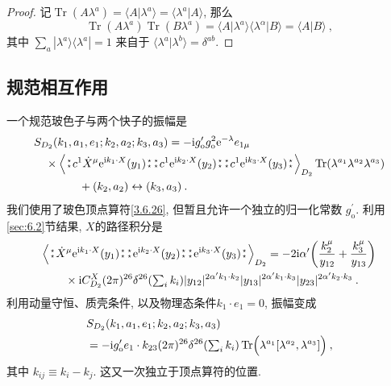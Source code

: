 \begin{tcolorbox}
	\begin{proof}
		记$\operatorname{Tr}(A \lambda^{a})=\langle A \vert \lambda^{a}\rangle=\langle\lambda^{a}|A\rangle$, 那么
		\[
		\operatorname{Tr}(A \lambda^{a}) \operatorname{Tr}(B \lambda^{a}) = 
		\langle A \vert \lambda^{a}\rangle\langle\lambda^{\alpha} \vert B\rangle=\langle A \vert B\rangle \:,
		\]
		其中 $\sum_{a}|\lambda^{a}\rangle\langle\lambda^{a}|=1$ 来自于 $\langle\lambda^{a} \vert \lambda^{b}\rangle= \delta^{a b}$.
	\end{proof}	
\end{tcolorbox}



\subsection*{规范相互作用}
一个规范玻色子与两个快子的振幅是	
\begin{align}
	&S_{D_{2}}(k_{1}, a_{1}, e_{1} ; k_{2}, a_{2} ; k_{3}, a_{3})= 
	-\mi g_{\mathrm{o}}^{\prime} g_{\mathrm{o}}^{2} \me^{-\lambda} e_{1 \mu} \nonumber \\
	&\quad \times\Bigl\langle \bno c^{1} \dot{X}^{\mu} \me^{\mi k_{1} \cdot X}(y_{1})\bno 
	 \bno  c^{1} \me^{\mi k_{2} \cdot X}(y_{2})\bno \bno c^{1} \me^{\mi k_{3} \cdot X}(y_{3})\bno\Bigr\rangle_{D_{2}} 
	\operatorname{Tr}(\lambda^{a_{1}} \lambda^{a_{2}} \lambda^{a_{3}})  \nonumber\\
	&\qquad \qquad +(k_{2}, a_{2}) \leftrightarrow(k_{3}, a_{3}) \:. \label{6.5.10}
\end{align}
我们使用了玻色顶点算符\eqref{3.6.26}, 但暂且允许一个独立的归一化常数 $g_{\mathrm{o}}^{\prime}$. 利用\ref{sec:6.2}节结果,  
$X$的路径积分是
\begin{align}
	&\Bigl\langle \bno \dot{X}^{\mu} \me^{\mi k_{1} \cdot X}(y_{1})\bno \bno \me^{\mi k_{2} \cdot X}(y_{2})\bno 
	\bno \me^{\mi k_{3} \cdot X}(y_{3})\bno \Bigr\rangle_{D_{2}} 
	=-2 \mi \alpha^{\prime}\biggl(\frac{k_{2}^{\mu}}{y_{12}}+\frac{k_{3}^{\mu}}{y_{13}}\biggr) \nonumber \\
	&\qquad \times \mi C_{D_{2}}^{X}(2 \pi)^{26} \delta^{26}({\textstyle \sum_{i} k_{i}})
	|y_{12}|^{2 \alpha^{\prime} k_{1} \cdot k_{2}}|y_{13}|^{2 \alpha^{\prime} k_{1} \cdot k_{3}} 
	|y_{23}|^{2 \alpha^{\prime} k_{2} \cdot k_{3}} \:. \label{6.5.11}
\end{align}
利用动量守恒、质壳条件, 以及物理态条件$k_{1} \cdot e_{1}=0$, 振幅变成
\begin{align}
	&S_{D_{2}}(k_{1}, a_{1}, e_{1} ; k_{2}, a_{2} ; k_{3}, a_{3}) \nonumber \\
	&=-\mathrm{i} g_{\mathrm{o}}^{\prime} e_{1} \cdot k_{23}(2 \pi)^{26} \delta^{26}({\textstyle \sum_{i} k_{i}}) 
	\operatorname{Tr}\Bigl(\lambda^{a_{1}}[\lambda^{a_{2}}, \lambda^{a_{3}}]\Bigr) \:, \label{6.5.12}
\end{align}
其中 $k_{i j} \equiv k_{i}-k_{j} $.  这又一次独立于顶点算符的位置.

